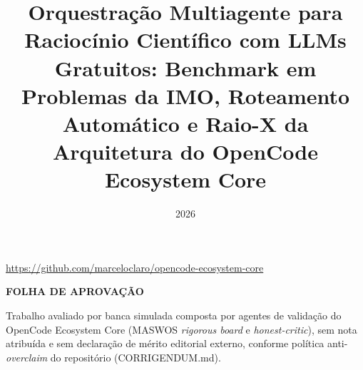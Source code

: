 \maketitle

\title{Orquestração Multiagente para Raciocínio Científico com LLMs Gratuitos: Benchmark em Problemas da IMO, Roteamento Automático e Raio-X da Arquitetura do OpenCode Ecosystem Core}
\date{2026}
\url{https://github.com/marceloclaro/opencode-ecosystem-core}

\begin{fichacatalografica}
\sffamily
\vspace*{\fill}
\end{fichacatalografica}

\begin{folhadeaprovacao}
\begin{center}
{\ABNTEXchapterfont\bfseries FOLHA DE APROVAÇÃO}
\end{center}
Trabalho avaliado por banca simulada composta por agentes de validação do
OpenCode Ecosystem Core (MASWOS \textit{rigorous board} e \textit{honest-critic}),
sem nota atribuída e sem declaração de mérito editorial externo, conforme
política anti-\textit{overclaim} do repositório (CORRIGENDUM.md).
\end{folhadeaprovacao}